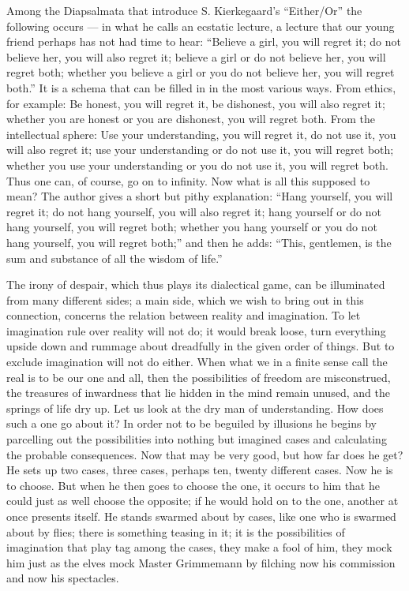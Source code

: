 \documentclass[12pt,a4paper,openany]{book}
\newcommand{\opage}[1]{\marginnote{\footnotesize\textit{[#1]}}}
\begin{document}
Among the Diapsalmata that introduce S. Kierkegaard's ``Either/Or'' the following occurs --- in what he calls an
ecstatic lecture, a lecture that our young friend perhaps has not had time to hear: ``Believe a girl, you will regret
it; do not believe her, you will also regret it; believe a girl or do not believe her, you will regret both; whether
you believe a girl or you do not believe her, you will regret both.'' It is a schema that can be filled in in the most
various ways. From ethics, for example: Be honest, you will regret it, be dishonest, you will also regret it; whether
you are honest or you are dishonest, you will regret both. From the intellectual sphere: Use your understanding, you
will regret it, do not use it, you will also regret it; use your understanding or do not use it, you will regret both;
whether you use your understanding or you do not
\setcounter{footnote}{0}%
\opage{8}use it, you will regret both. Thus one can, of course, go on to infinity. Now what is all this supposed to
mean? The author gives a short but pithy explanation: ``Hang yourself, you will regret it; do not hang yourself, you
will also regret it; hang yourself or do not hang yourself, you will regret both; whether you hang yourself or you do
not hang yourself, you will regret both;'' and then he adds: ``This, gentlemen, is the sum and substance of all the
wisdom of life.''

The irony of despair, which thus plays its dialectical game, can be illuminated from many different sides; a main
side, which we wish to bring out in this connection, concerns the relation between reality and imagination. To let
imagination rule over reality will not do; it would break loose, turn everything upside down and rummage about
dreadfully in the given order of things. But to exclude imagination will not do either. When what we in a finite
sense call the real is to be our one and all, then the possibilities of freedom are misconstrued, the treasures of
inwardness that lie hidden in the mind remain unused, and the springs of life dry up. Let us look at the dry man of
understanding. How does such a one go about it? In order not to be beguiled by illusions he begins by parcelling out
the possibilities into nothing but imagined cases and calculating the probable consequences. Now that may be very good,
but how far does he get? He sets up two cases, three cases, perhaps ten, twenty different cases. Now he is to choose.
But when he then goes to choose the one, it occurs to him that he could just as well choose the opposite; if he would
hold on to the one, another at once presents itself. He stands swarmed about by cases,
\setcounter{footnote}{0}%
\opage{9}like one who is swarmed about by flies; there is something teasing in it; it is the possibilities of
imagination that play tag among the cases, they make a fool of him, they mock him just as the elves mock Master
Grimmemann by filching now his commission and now his spectacles.
\end{document}
